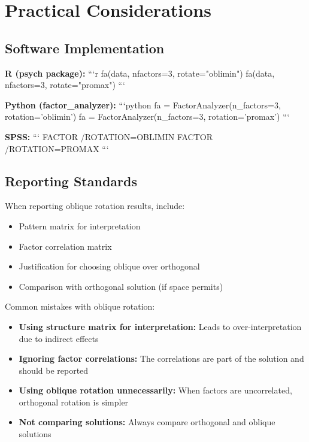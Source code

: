 \documentclass[a4paper]{tufte-book}
\begin{document}
\section{Practical Considerations}

\subsection{Software Implementation}

\textbf{R (psych package):}
```r
fa(data, nfactors=3, rotate="oblimin")
fa(data, nfactors=3, rotate="promax")
```

\textbf{Python (factor_analyzer):}
```python
fa = FactorAnalyzer(n_factors=3, rotation='oblimin')
fa = FactorAnalyzer(n_factors=3, rotation='promax')
```

\textbf{SPSS:}
```
FACTOR /ROTATION=OBLIMIN
FACTOR /ROTATION=PROMAX
```

\subsection{Reporting Standards}

When reporting oblique rotation results, include:
\begin{itemize}
\item Pattern matrix for interpretation
\item Factor correlation matrix
\item Justification for choosing oblique over orthogonal
\item Comparison with orthogonal solution (if space permits)
\end{itemize}

\begin{commonmistake}
Common mistakes with oblique rotation:
\begin{itemize}
\item \textbf{Using structure matrix for interpretation:} Leads to over-interpretation due to indirect effects
\item \textbf{Ignoring factor correlations:} The correlations are part of the solution and should be reported
\item \textbf{Using oblique rotation unnecessarily:} When factors are uncorrelated, orthogonal rotation is simpler
\item \textbf{Not comparing solutions:} Always compare orthogonal and oblique solutions
\end{itemize}
\end{commonmistake}
\end{document}
